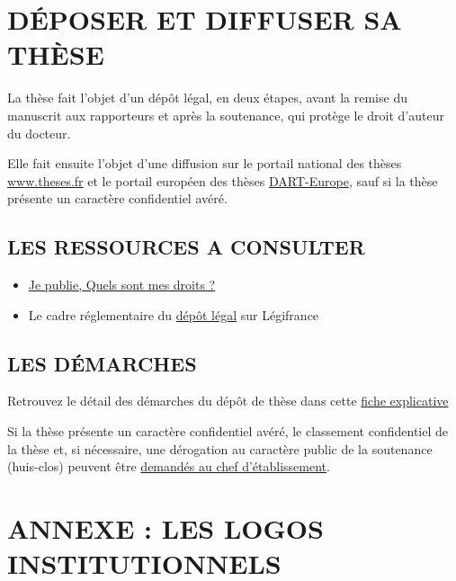 \documentclass[french,12pt,a4paper]{book}
\begin{document}
\chapter{DÉPOSER ET DIFFUSER SA THÈSE}
La thèse fait l’objet d’un dépôt légal, en deux étapes, avant la remise du manuscrit aux rapporteurs et après la soutenance, qui protège le droit d’auteur du docteur.\\ \par 
Elle fait ensuite l’objet d’une diffusion sur le portail national des thèses \url{www.theses.fr} et le portail européen des thèses \href{https://www.dart-europe.org/basic-search.php}{DART-Europe}, sauf si la thèse présente un caractère confidentiel avéré.
\section{LES RESSOURCES A CONSULTER}

\begin{itemize}
\renewcommand{\labelitemi}{$\bullet$}
\item \href{http://corist-shs.cnrs.fr/sites/default/files/ressources/droit_auteur_lecture_vf.pdf}{Je publie, Quels sont mes droits ?}
\item Le cadre réglementaire du \href{https://www.legifrance.gouv.fr/codes/article_lc/LEGIARTI000006845515/}{dépôt légal} sur Légifrance
\end{itemize}

\section{LES DÉMARCHES}
Retrouvez le détail des démarches du dépôt de thèse dans cette \href{https://www.universite-paris-saclay.fr/sites/default/files/2021-12/fiche-depot-legal-these-2021_0.pdf}{fiche explicative}\\ \par
Si la thèse présente un caractère confidentiel avéré, le classement confidentiel de la thèse et, si nécessaire, une dérogation au caractère public de la soutenance (huis-clos) peuvent être \href{https://www.universite-paris-saclay.fr/research/doctorate/quality-assurance-documents/documents-de-reference-relatifs-la-soutenance-de-la-these}{demandés au chef d’établissement}.


\chapter{ANNEXE : LES LOGOS INSTITUTIONNELS}
\end{document}
